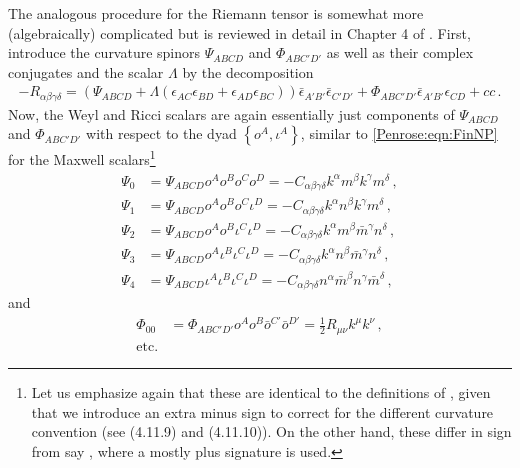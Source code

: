 The analogous procedure for the Riemann tensor is somewhat more (algebraically) complicated but is reviewed in detail in Chapter 4 of \cite{Penrose:1985bww}. First, introduce the curvature spinors $\Psi_{ABCD}$ and $\Phi_{ABC'D'}$ as well as their complex conjugates and the scalar $\Lambda$ by the decomposition
\begin{equation}
\begin{aligned}
-R_{\alpha \beta \gamma \delta} = \left(\Psi_{ABCD} 	+ \Lambda  \left(\epsilon_{AC}\epsilon_{BD}+\epsilon_{AD}\epsilon_{BC}\right) \right)\bar{\epsilon}_{A'B'}\bar{\epsilon}_{C'D'} + \Phi_{ABC'D'} \bar{\epsilon}_{A'B'} \epsilon_{CD}
+ cc\, .
\end{aligned}
\end{equation}
Now, the Weyl and Ricci scalars are again essentially just components of $\Psi_{ABCD}$ and $\Phi_{ABC'D'}$ with respect to the dyad $\left\lbrace o^A, \iota^A \right \rbrace$, similar to \eqref{Penrose:eqn:FinNP} for the Maxwell scalars\footnote{Let us emphasize again that these are identical to the definitions of \cite{Penrose:1985bww}, given that we introduce an extra minus sign to correct for the different curvature convention (see (4.11.9) and (4.11.10)). On the other hand, these differ in sign from say \cite{Pound:2021qin}, where a mostly plus signature is used.}
\begin{equation}\label{Penrose:eqn:psidefs}
\begin{aligned}
\Psi_0 &= \Psi_{ABCD} o^Ao^Bo^Co^D =- C_{\alpha \beta \gamma \delta} k^{\alpha}m^{\beta}k^{\gamma} m^{\delta} \, , \\
\Psi_1 &= \Psi_{ABCD} o^Ao^Bo^C\iota^D = -C_{\alpha \beta \gamma \delta} k^{\alpha}n^{\beta}k^{\gamma} m^{\delta} \, , \\
\Psi_2 &= \Psi_{ABCD} o^Ao^B\iota^C\iota^D = -C_{\alpha \beta \gamma \delta} k^{\alpha}m^{\beta}\bar{m}^{\gamma} n^{\delta} \, , \\
\Psi_3 &= \Psi_{ABCD} o^A\iota^B\iota^C\iota^D = -C_{\alpha \beta \gamma \delta} k^{\alpha}n^{\beta}\bar{m}^{\gamma}n^{\delta} \, , \\
\Psi_4 &= \Psi_{ABCD} \iota^A\iota^B\iota^C\iota^D =- C_{\alpha \beta \gamma \delta} n^{\alpha}\bar{m}^{\beta}n^{\gamma} \bar{m}^{\delta} \, ,  
\end{aligned}
\end{equation}
and
\begin{equation}\label{Penrose:eqn:phidefs}
\begin{aligned}
\Phi_{00} &= \Phi_{ABC'D'} o^Ao^B\bar{o}^{C'}\bar{o}^{D'} = \frac{1}{2}R_{\mu \nu} k^{\mu} k^{\nu} \, ,\\
\text{etc.}
\end{aligned}
\end{equation}
